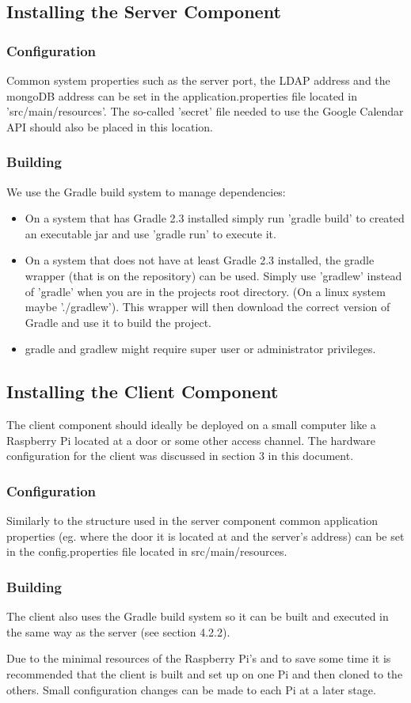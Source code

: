 \subsection{Installing the Server Component}   

\subsubsection{Configuration}
	Common system properties such as the server port, the LDAP address and the mongoDB address can be set in the application.properties file located in 'src/main/resources'. The so-called 'secret' file needed to use the Google Calendar API should also be placed in this location.
	
\subsubsection{Building}
We use the Gradle build system to manage dependencies:
	\begin{itemize}
		\item On a system that has Gradle 2.3 installed simply run 'gradle build'  to created an executable jar and use 'gradle run' to execute it.
		\item On a system that does not have at least Gradle 2.3 installed, the gradle wrapper (that is on the repository) can be used. Simply use 'gradlew' instead of 'gradle' when you are in the projects root directory. (On a linux system maybe './gradlew'). This wrapper will then download the correct version of Gradle and use it to build the project.
		\item gradle and gradlew might require super user or administrator privileges.
	\end{itemize}

\subsection{Installing the Client Component} 
The client component should ideally be deployed on a small computer like a Raspberry Pi located at a door or some other access channel. The hardware configuration for the client was discussed in section 3 in this document.

\subsubsection{Configuration}
Similarly to the structure used in the server component common application properties (eg. where the door it is located at and the server's address) can be set in the config.properties file located in src/main/resources.

\subsubsection{Building}
The client also uses the Gradle build system so it can be built and executed in the same way as the server (see section 4.2.2).

Due to the minimal resources of the Raspberry Pi's and to save some time it is recommended that the client is built and set up on one Pi and then cloned to the others. Small configuration changes can be made to each Pi at a later stage.